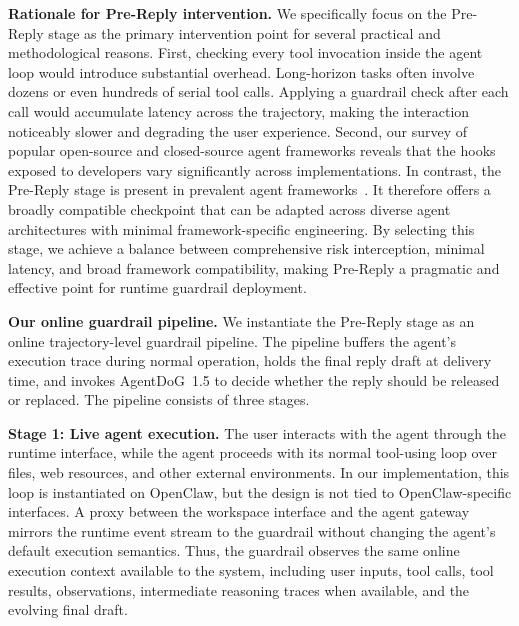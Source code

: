 \documentclass{llmxive}
\providecommand{\prereply}{{Pre-Reply}\xspace}
\providecommand{\agentdog}{AgentDoG~1.5\xspace}
\begin{document}
\textbf{Rationale for \prereply{} intervention.} We specifically focus on the \prereply{} stage as the primary intervention point for several practical and methodological reasons. First, checking every tool invocation inside the agent loop would introduce substantial overhead. Long-horizon tasks often involve dozens or even hundreds of serial tool calls. Applying a guardrail check after each call would accumulate latency across the trajectory, making the interaction noticeably slower and degrading the user experience.
Second, our survey of popular open-source and closed-source agent frameworks reveals that the hooks exposed to developers vary significantly across implementations. In contrast, the \prereply{} stage is present in prevalent agent frameworks~\citep{openai2026codexhooks,nousresearch2026hermeshooks,openclaw2026pluginhooks}. It therefore offers a broadly compatible checkpoint that can be adapted across diverse agent architectures with minimal framework-specific engineering. By selecting this stage, we achieve a balance between comprehensive risk interception, minimal latency, and broad framework compatibility, making \prereply{} a pragmatic and effective point for runtime guardrail deployment.



\textbf{Our online guardrail pipeline.} We instantiate the \prereply{} stage as an online trajectory-level guardrail pipeline. The pipeline buffers the agent's execution trace during normal operation, holds the final reply draft at delivery time, and invokes \agentdog{} to decide whether the reply should be released or replaced. The pipeline consists of three stages.

\textbf{Stage 1: Live agent execution.} The user interacts with the agent through the runtime interface, while the agent proceeds with its normal tool-using loop over files, web resources, and other external environments. In our implementation, this loop is instantiated on OpenClaw, but the design is not tied to OpenClaw-specific interfaces. A proxy between the workspace interface and the agent gateway mirrors the runtime event stream to the guardrail without changing the agent's default execution semantics. Thus, the guardrail observes the same online execution context available to the system, including user inputs, tool calls, tool results, observations, intermediate reasoning traces when available, and the evolving final draft.
\end{document}
